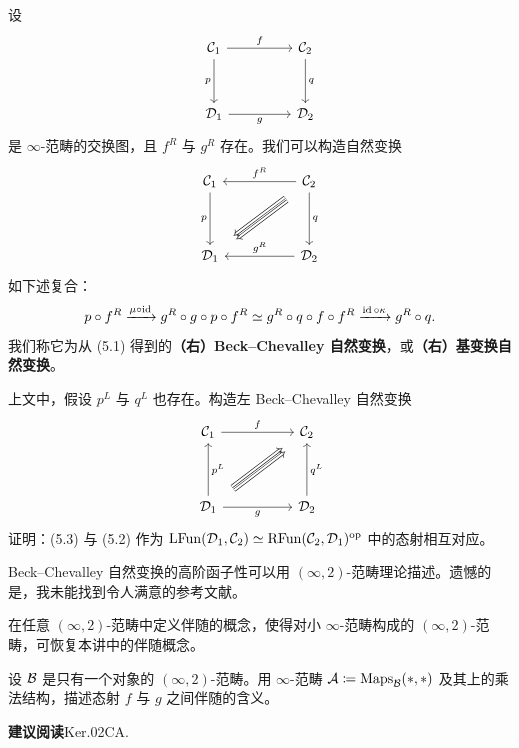 \begin{construction}\label{L12-5.1}
设
\begin{equation}\label{L12-eq5.1}
\begin{tikzcd}[column sep=4.5em,row sep=3.2em]
\cC_1 \arrow[r,"f"] \arrow[d,"p"'] & \cC_2 \arrow[d,"q"] \\
\cD_1 \arrow[r,"g"'] & \cD_2
\end{tikzcd}
\end{equation}
是 $\infty$-范畴的交换图，且 $f^{R}$ 与 $g^{R}$ 存在。我们可以构造自然变换
\begin{equation}\label{L12-eq5.2}
\begin{tikzcd}[column sep=5em,row sep=3.8em]
\cC_1 \arrow[d,"p"'] & \cC_2 \arrow[l,"f^{R}"'] \arrow[d,"q"] \arrow[dl,Rightarrow,shift left=1.6pt,shorten <=0.9em,shorten >=0.9em] \arrow[dl,Rightarrow,shift right=1.6pt,shorten <=0.9em,shorten >=0.9em] \\
\cD_1 & \cD_2 \arrow[l,"g^{R}"']
\end{tikzcd}
\end{equation}
如下述复合：
\[
p\circ f^{R}\xrightarrow{\mu\circ\operatorname{id}}g^{R}\circ g\circ p\circ f^{R}\simeq g^{R}\circ q\circ f\circ f^{R}\xrightarrow{\operatorname{id}\circ\kappa}g^{R}\circ q.
\]
我们称它为从 (5.1) 得到的\textbf{（右）Beck–Chevalley 自然变换}，或\textbf{（右）基变换自然变换}。
\end{construction}

\begin{exercise}\label{L12-5.2}
上文中，假设 $p^{L}$ 与 $q^{L}$ 也存在。构造左 Beck–Chevalley 自然变换
\begin{equation}\label{L12-eq5.3}
\begin{tikzcd}[column sep=5em,row sep=3.8em]
\cC_1 \arrow[r,"f"] & \cC_2 \\
\cD_1 \arrow[u,"p^{L}"'] \arrow[r,"g"'] \arrow[ur,Rightarrow,shift left=1.6pt,shorten <=0.9em,shorten >=0.9em] \arrow[ur,Rightarrow,shift right=1.6pt,shorten <=0.9em,shorten >=0.9em] & \cD_2 \arrow[u,"q^{L}"']
\end{tikzcd}
\end{equation}
证明：(5.3) 与 (5.2) 作为 $\mathrm{LFun}(\mathcal{D}_1,\mathcal{C}_2)\simeq\mathrm{RFun}(\mathcal{C}_2,\mathcal{D}_1)^{\mathrm{op}}$ 中的态射相互对应。
\end{exercise}

\begin{remark}\label{L12-5.3}
Beck–Chevalley 自然变换的高阶函子性可以用 $(\infty,2)$-范畴理论描述。遗憾的是，我未能找到令人满意的参考文献。
\end{remark}


\begin{exercise}\label{L12-A.1}
在任意 $(\infty,2)$-范畴中定义伴随的概念，使得对小 $\infty$-范畴构成的 $(\infty,2)$-范畴，可恢复本讲中的伴随概念。
\end{exercise}

\begin{exercise}\label{L12-A.2}
设 $\mathcal{B}$ 是只有一个对象的 $(\infty,2)$-范畴。用 $\infty$-范畴 $\mathcal{A}\coloneqq\operatorname{Maps}_{\mathcal{B}}(*,*)$ 及其上的乘法结构，描述态射 $f$ 与 $g$ 之间伴随的含义。
\end{exercise}

\nitem\label{L12-A.3} \textbf{建议阅读}\quad Ker.02CA.

